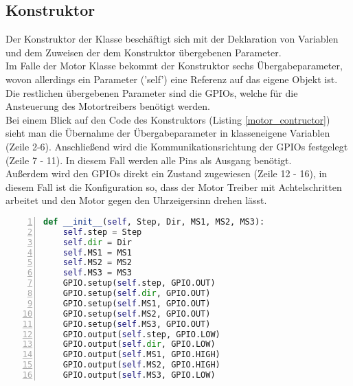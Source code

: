 \subsection{Konstruktor} 
Der Konstruktor der Klasse beschäftigt sich mit der Deklaration von Variablen und dem Zuweisen der dem Konstruktor übergebenen Parameter.\\
Im Falle der Motor Klasse bekommt der Konstruktor sechs Übergabeparameter, wovon allerdings ein Parameter ('self') eine Referenz auf das eigene Objekt ist.\\
Die restlichen übergebenen Parameter sind die \acp{GPIO}, welche für die Ansteuerung des Motortreibers benötigt werden.\\
Bei einem Blick auf den Code des Konstruktors (Listing \ref{motor_contructor}) sieht man die Übernahme der Übergabeparameter in klasseneigene Variablen (Zeile 2-6). Anschließend wird die Kommunikationsrichtung der \acp{GPIO} festgelegt (Zeile 7 - 11). In diesem Fall werden alle Pins als Ausgang benötigt.\\
Außerdem wird den \acp{GPIO} direkt ein Zustand zugewiesen (Zeile 12 - 16), in diesem Fall ist die Konfiguration so, dass der Motor Treiber mit Achtelschritten arbeitet und den Motor gegen den  Uhrzeigersinn drehen lässt.
\begin{lstlisting}[caption={Konstruktor der Motor Klasse}, language={Python}, label={motor_contructor}, numbers=left]
def __init__(self, Step, Dir, MS1, MS2, MS3):
    self.step = Step
    self.dir = Dir
    self.MS1 = MS1
    self.MS2 = MS2
    self.MS3 = MS3
    GPIO.setup(self.step, GPIO.OUT)
    GPIO.setup(self.dir, GPIO.OUT)
    GPIO.setup(self.MS1, GPIO.OUT)
    GPIO.setup(self.MS2, GPIO.OUT)
    GPIO.setup(self.MS3, GPIO.OUT)
    GPIO.output(self.step, GPIO.LOW)
    GPIO.output(self.dir, GPIO.LOW)
    GPIO.output(self.MS1, GPIO.HIGH)
    GPIO.output(self.MS2, GPIO.HIGH)
    GPIO.output(self.MS3, GPIO.LOW)
\end{lstlisting}

